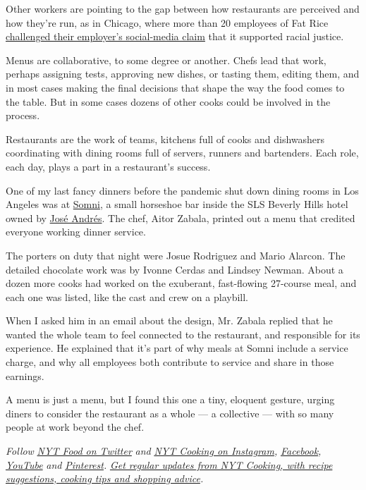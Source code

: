 Other workers are pointing to the gap between how restaurants are
perceived and how they're run, as in Chicago, where more than 20
employees of Fat Rice
\href{https://www.nytimes3xbfgragh.onion/2020/06/16/dining/fat-rice-chicago-abe-conlon-racism.html}{challenged
their employer's social-media claim} that it supported racial justice.

Menus are collaborative, to some degree or another. Chefs lead that
work, perhaps assigning tests, approving new dishes, or tasting them,
editing them, and in most cases making the final decisions that shape
the way the food comes to the table. But in some cases dozens of other
cooks could be involved in the process.

Restaurants are the work of teams, kitchens full of cooks and
dishwashers coordinating with dining rooms full of servers, runners and
bartenders. Each role, each day, plays a part in a restaurant's success.

One of my last fancy dinners before the pandemic shut down dining rooms
in Los Angeles was at \href{https://www.thebazaar.com/somni/}{Somni}, a
small horseshoe bar inside the SLS Beverly Hills hotel owned by
\href{https://www.nytimes3xbfgragh.onion/2017/10/30/dining/jose-andres-puerto-rico.html}{José
Andrés}. The chef, Aitor Zabala, printed out a menu that credited
everyone working dinner service.

The porters on duty that night were Josue Rodriguez and Mario Alarcon.
The detailed chocolate work was by Ivonne Cerdas and Lindsey Newman.
About a dozen more cooks had worked on the exuberant, fast-flowing
27-course meal, and each one was listed, like the cast and crew on a
playbill.

When I asked him in an email about the design, Mr. Zabala replied that
he wanted the whole team to feel connected to the restaurant, and
responsible for its experience. He explained that it's part of why meals
at Somni include a service charge, and why all employees both contribute
to service and share in those earnings.

A menu is just a menu, but I found this one a tiny, eloquent gesture,
urging diners to consider the restaurant as a whole --- a collective ---
with so many people at work beyond the chef.

\emph{Follow} \href{https://twitter.com/nytfood}{\emph{NYT Food on
Twitter}} \emph{and}
\href{https://www.instagram.com/nytcooking/}{\emph{NYT Cooking on
Instagram}}\emph{,}
\href{https://www.facebookcorewwwi.onion/nytcooking/}{\emph{Facebook}}\emph{,}
\href{https://www.youtube.com/nytcooking}{\emph{YouTube}} \emph{and}
\href{https://www.pinterest.com/nytcooking/}{\emph{Pinterest}}\emph{.}
\href{https://www.nytimes3xbfgragh.onion/newsletters/cooking}{\emph{Get
regular updates from NYT Cooking, with recipe suggestions, cooking tips
and shopping advice}}\emph{.}


